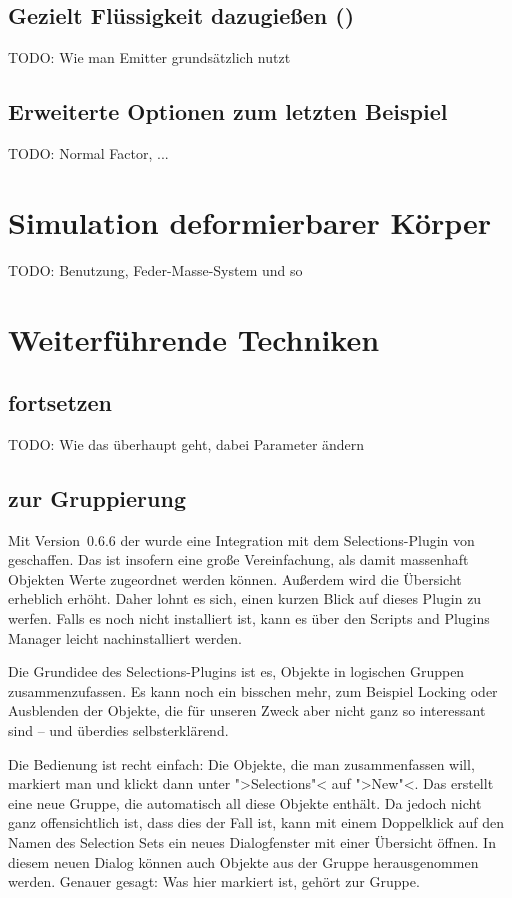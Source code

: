 \documentclass[10pt,DIV=14,a4paper]{scrartcl}
\begin{document}
\subsection{Gezielt Flüssigkeit dazugießen ()}
TODO: Wie man Emitter grundsätzlich nutzt

\subsection{Erweiterte Optionen zum letzten Beispiel}
TODO: Normal Factor, ... 



\pagebreak
\section{Simulation deformierbarer Körper}
TODO: Benutzung, Feder-Masse-System und so


\pagebreak
\section{Weiterführende Techniken}

\subsection{ fortsetzen}
TODO: Wie das überhaupt geht, dabei Parameter ändern

\subsection{ zur Gruppierung}
Mit Version~0.6.6 der \fluidsim wurde eine Integration mit dem
Selections-Plugin von \aoi geschaffen. Das ist insofern eine große
Vereinfachung, als damit massenhaft Objekten Werte zugeordnet werden
können. Außerdem wird die Übersicht erheblich erhöht. Daher lohnt es
sich, einen kurzen Blick auf dieses Plugin zu werfen. Falls es noch
nicht installiert ist, kann es über den Scripts and Plugins Manager
leicht nachinstalliert werden.

Die Grundidee des Selections-Plugins ist es, Objekte in logischen
Gruppen zusammenzufassen. Es kann noch ein bisschen mehr, zum Beispiel
Locking oder Ausblenden der Objekte, die für unseren Zweck aber nicht
ganz so interessant sind -- und überdies selbst\-er\-klä\-rend.

Die Bedienung ist recht einfach: Die Objekte, die man zusammenfassen
will, markiert man und klickt dann unter ">Selections"< auf ">New"<. Das
erstellt eine neue Gruppe, die automatisch all diese Objekte enthält. Da
jedoch nicht ganz offensichtlich ist, dass dies der Fall ist, kann mit
einem Doppelklick auf den Namen des Selection Sets ein neues
Dialogfenster mit einer Übersicht öffnen. In diesem neuen Dialog können
auch Objekte aus der Gruppe herausgenommen werden. Genauer gesagt: Was
hier markiert ist, gehört zur Gruppe.
\end{document}

